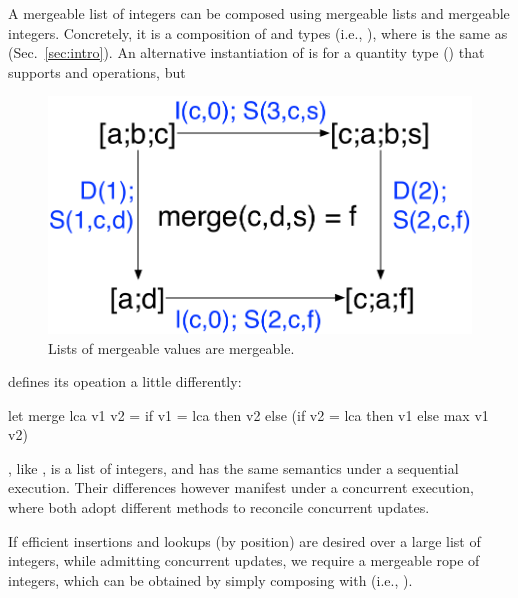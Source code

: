 A mergeable list of integers can be composed using mergeable lists and
mergeable integers.  Concretely, it is a composition of  and
 types (i.e., ), where  is the same
as  (Sec.~\ref{sec:intro}).  An alternative
instantiation of  is for a quantity type
() that supports  and  operations, but
\begin{figure}
  \centering
  \includegraphics[scale=0.4]{Figures/list-eg}
  \caption{Lists of mergeable values are mergeable. }
  \label{fig:list-eg}
  \vspace*{-.2in}
\end{figure}
defines its  opeation a little differently:
\begin{ocaml}
let merge lca v1 v2 = if v1 = lca then v2
    else (if v2 = lca then v1 else max v1 v2)
\end{ocaml}
, like , is a list of integers, and has
the same semantics under a sequential execution. Their differences
however manifest under a concurrent execution, where both adopt
different methods to reconcile concurrent updates.

If efficient insertions and lookups (by position) are desired over a
large list of integers, while admitting concurrent updates, we require
a mergeable rope of integers, which can be obtained by simply
composing  with  (i.e., ).


